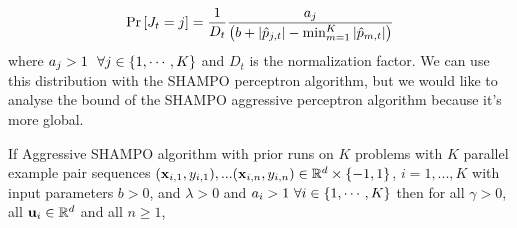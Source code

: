 {\begin{equation*}
{\rm Pr}\left[{J_t=j}\right] =
\frac{1}{D_{t}}\frac{a_{j}}{\left({b+\left\vert{\hat{p}_{j,t}}\right\vert-\min_{m=1}^K\left\vert{\hat{p}_{m,t}}\right\vert}\right)} \end{equation*}
where $a_j>1~~\forall j\in\left\{{1,\cdots,K}\right\}$ and  $D_t$ is the normalization factor. We can use this distribution with the SHAMPO perceptron algorithm, but we would like to analyse the bound of the SHAMPO aggressive perceptron algorithm because it's more global. 

\begin{theorem}
  If Aggressive SHAMPO algorithm with prior runs on $K$ problems with $K$ parallel example pair
  sequences
  $(\mathbf{x}_{i,1},y_{i,1}),...(\mathbf{x}_{i,n},y_{i,n})\in\mathbb{R}^d\times\{-1,1\}$,
  $i=1,...,K$ with input parameters $b>0$, and $\lambda>0$  and $a_i>1~\forall i\in\left\{{1,\cdots,K}\right\}$ then for all $\gamma>0$, all
  $\mathbf{u}_{i}\in\mathbb{R}^d$ and all $n\ge1$,
  

\end{theorem}}
